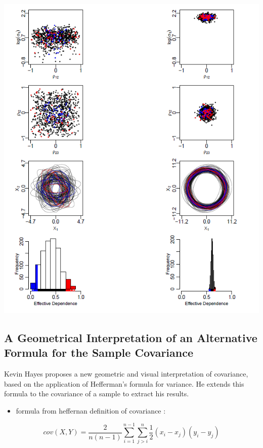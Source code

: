 \documentclass[
]{report}
\providecommand{\tightlist}{%
  \setlength{\itemsep}{0pt}\setlength{\parskip}{0pt}}
\begin{document}
\includegraphics[width=8.74in]{wtf_covViz}

\hypertarget{a-geometrical-interpretation-of-an-alternative-formula-for-the-sample-covariance}{%
\subsection{A Geometrical Interpretation of an Alternative Formula for the Sample Covariance}\label{a-geometrical-interpretation-of-an-alternative-formula-for-the-sample-covariance}}

Kevin Hayes \citep{Hayes} proposes a new geometric and visual interpretation of covariance, based on the application of Hefferman's formula for variance. He extends this formula to the covariance of a sample to extract his results.

\begin{itemize}
\tightlist
\item
  formula from heffernan definition of covariance :
\end{itemize}

\[cov(X,Y)= \frac{2}{n(n-1)}\sum_{i=1}^{n-1}\sum_{j>i}^{n}\frac{1}{2}(x_i-x_j)(y_i - y_j)\]
\end{document}
